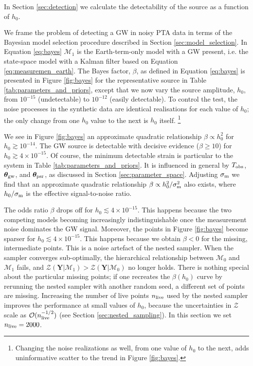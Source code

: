\documentclass[fleqn,usenatbib,useAMS]{mnras}
\begin{document}
		
		
		In Section \ref{sec:detection} we calculate the detectability of the source as a function of $h_0$. \newline
		
		
		We frame the problem of detecting a GW in noisy PTA data in terms of the Bayesian model selection procedure described in Section \ref{sec:model_selection}. In Equation \eqref{eq:bayes} $\mathcal{M}_1$ is the Earth-term-only model with a GW present, i.e. the state-space model with a Kalman filter based on Equation \eqref{eq:measuremen_earth}. The Bayes factor, $\beta$, as defined in Equation \eqref{eq:bayes} is presented in Figure \ref{fig:bayes} for the representative source in Table \ref{tab:parameters_and_priors}, except that we now vary the source amplitude, $h_0$, from $10^{-15}$ (undetectable) to $10^{-12}$ (easily detectable). To control the test, the noise processes in the synthetic data are identical realisations for each value of $h_0$; the only change from one $h_0$ value to the next is $h_0$ itself. \footnote{Changing the noise realizations as well, from one value of $h_0$ to the next, adds uninformative scatter to the trend in Figure \ref{fig:bayes}.} \newline 
		
		
		We see in Figure \ref{fig:bayes} an approximate quadratic relationship $\beta \propto h_0^2$ for $h_0 \gtrsim 10^{-14}$. The GW source is detectable with decisive evidence ($\beta \geq 10$) for $h_0 \gtrsim 4 \times 10^{-15}$. Of course, the minimum detectable strain is particular to the system in Table \ref{tab:parameters_and_priors}. It is influenced in general by $T_{\rm obs}$, ${\boldsymbol{\theta}}_{\rm gw}$, and ${\boldsymbol{\theta}}_{\rm psr}$, as discussed in Section \ref{sec:parameter_space}. Adjusting $\sigma_{\rm m}$ we find that an approximate quadratic relationship $\beta \propto h_0^2 / \sigma_{\rm m}^2$ also exists, where $h_0 / \sigma_{\rm m}$ is the effective signal-to-noise ratio. \newline 
		
		
		The odds ratio $\beta$ drops off for $h_0 \lesssim 4 \times10^{-15}$. This happens because the two competing models becoming increasingly indistinguishable once the measurement noise dominates the GW signal. Moreover, the points in Figure \ref{fig:bayes} become sparser for $h_0 \lesssim 4 \times 10^{-15}$. This happens because we obtain $\beta <0$ for the missing, intermediate points. This is a noise artefact of the nested sampler. When the sampler converges sub-optimally, the hierarchical relationship between $\mathcal{M}_0$ and  $\mathcal{M}_1$ fails, and $\mathcal{Z}(\boldsymbol{Y} | \mathcal{M}_1) > \mathcal{Z}(\boldsymbol{Y} | \mathcal{M}_0)$ no longer holds. There is nothing special about the particular missing points; if one recreates the $\beta(h_0)$ curve by rerunning the nested sampler with another random seed, a different set of points are missing. Increasing the number of live points $n_{\rm live}$ used by the nested sampler improves the performance at small values of $h_0$, because the uncertainties in $\mathcal{Z}$ scale as $\mathcal{O}(n_{\rm live}^{-1/2})$ (see Section \ref{sec:nested_sampling}). In this section we set $n_{\rm live} =2000$. 
		
\end{document}
